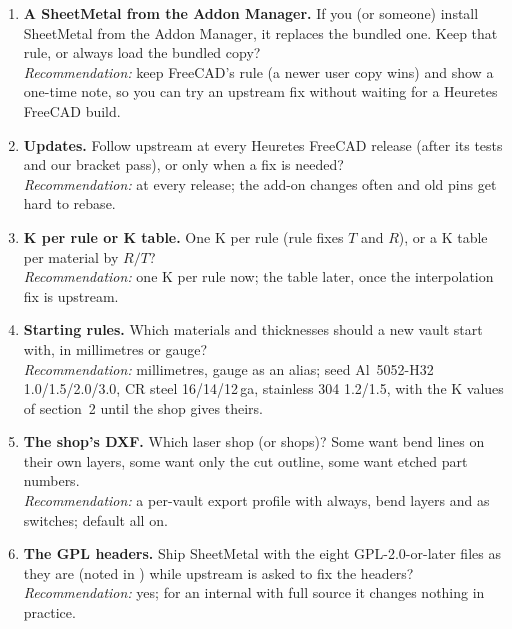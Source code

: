 \begin{enumerate}
  \item \textbf{A SheetMetal from the Addon Manager.} If you (or someone) install SheetMetal from the Addon Manager, it
        replaces the bundled one. Keep that rule, or always load the bundled copy?\\
        \emph{Recommendation:} keep FreeCAD's rule (a newer user copy wins) and show a one-time note, so you can try an
        upstream fix without waiting for a Heuretes FreeCAD build.
  \item \textbf{Updates.} Follow upstream at every Heuretes FreeCAD release (after its tests and our bracket pass), or only
        when a fix is needed?\\
        \emph{Recommendation:} at every release; the add-on changes often and old pins get hard to rebase.
  \item \textbf{K per rule or K table.} One K per rule (rule fixes $T$ and $R$), or a K table per material by $R/T$?\\
        \emph{Recommendation:} one K per rule now; the table later, once the interpolation fix is upstream.
  \item \textbf{Starting rules.} Which materials and thicknesses should a new vault start with, in millimetres or
        gauge?\\
        \emph{Recommendation:} millimetres, gauge as an alias; seed Al~5052-H32 1.0/1.5/2.0/3.0, CR steel 16/14/12\,ga,
        stainless 304 1.2/1.5, with the K values of section~2 until the shop gives theirs.
  \item \textbf{The shop's DXF.} Which laser shop (or shops)? Some want bend lines on their own layers, some want
        only the cut outline, some want etched part numbers.\\
        \emph{Recommendation:} a per-vault export profile with  always, bend layers and  as
        switches; default all on.
  \item \textbf{The GPL headers.} Ship SheetMetal with the eight GPL-2.0-or-later files as they are (noted in
        ) while upstream is asked to fix the headers?\\
        \emph{Recommendation:} yes; for an internal  with full source it changes nothing in practice.
\end{enumerate}
